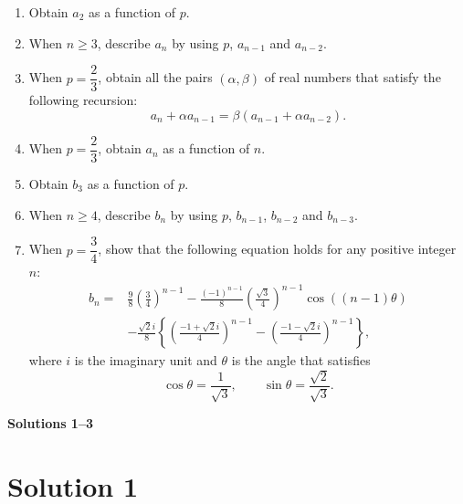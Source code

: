 \documentclass[10pt,a4paper]{article}
\begin{document}
\begin{enumerate}
  \item Obtain $a_2$ as a function of $p$.

  \item When $n\geq 3$, describe $a_n$ by using $p$, $a_{n-1}$ and $a_{n-2}$.

  \item When $p=\dfrac{2}{3}$, obtain all the pairs $(\alpha,\beta)$ of real numbers that satisfy the following recursion:
        \[
          a_n+\alpha a_{n-1}=\beta(a_{n-1}+\alpha a_{n-2}).
        \]

  \item When $p=\dfrac{2}{3}$, obtain $a_n$ as a function of $n$.

  \item Obtain $b_3$ as a function of $p$.

  \item When $n\geq 4$, describe $b_n$ by using $p$, $b_{n-1}$, $b_{n-2}$ and $b_{n-3}$.

  \item When $p=\dfrac{3}{4}$, show that the following equation holds for any positive integer $n$:
        \[
          \begin{aligned}
            b_n={}&
            \frac{9}{8}\left(\frac{3}{4}\right)^{n-1}
            -\frac{(-1)^{n-1}}{8}
            \left(\frac{\sqrt{3}}{4}\right)^{n-1}
            \cos((n-1)\theta) \\
            &-\frac{\sqrt{2}i}{8}
            \left\{
            \left(\frac{-1+\sqrt{2}i}{4}\right)^{n-1}
            -
            \left(\frac{-1-\sqrt{2}i}{4}\right)^{n-1}
            \right\},
          \end{aligned}
        \]
        where $i$ is the imaginary unit and $\theta$ is the angle that satisfies
        \[
          \cos\theta=\frac{1}{\sqrt{3}},
          \qquad
          \sin\theta=\frac{\sqrt{2}}{\sqrt{3}}.
        \]
\end{enumerate}

\newpage

\begin{center}
  {\Large \textbf{Solutions 1--3}}
\end{center}

\section*{Solution 1}
\end{document}

